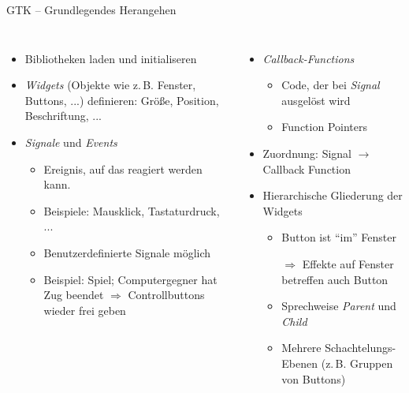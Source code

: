 \begin{frame}{GTK -- Grundlegendes Herangehen}
%
\begin{columns}[T]
\begin{itemize}
\item Bibliotheken laden und initialiseren
\item \emph{Widgets} (Objekte  wie z.\,B. Fenster, Buttons, ...) definieren: Größe, Position,
	Beschriftung, ...
\item \emph{Signale} und \emph{Events}
	\begin{itemize}
	\item Ereignis, auf das reagiert werden kann. 
	\item Beispiele: Mausklick, Tastaturdruck, ...
	\item Benutzerdefinierte Signale möglich
	\item Beispiel: Spiel; Computergegner hat Zug beendet $\Rightarrow$ Controllbuttons wieder frei geben
	\end{itemize}
\end{itemize}
%
\begin{itemize}
\item \emph{Callback-Functions}
	\begin{itemize}
	\item Code, der bei \emph{Signal} ausgelöst wird
	\item Function Pointers
	\end{itemize}
\item Zuordnung: Signal $\rightarrow$ Callback Function
\item Hierarchische Gliederung der Widgets
	\begin{itemize}
	\item Button ist \enquote{im} Fenster
	\item[$\Rightarrow$] Effekte auf Fenster betreffen auch Button
	\item Sprechweise \emph{Parent} und \emph{Child}
	\item Mehrere Schachtelungs-Ebenen (z.\,B. Gruppen von Buttons)
	\end{itemize}
\end{itemize}
\end{columns}
%
\end{frame}


